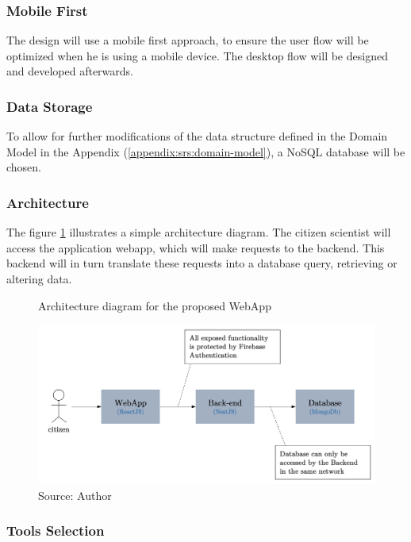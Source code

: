 \subsubsection{Mobile First}

The design will use a mobile first approach, to ensure the user flow will be optimized when he is using a mobile device. The desktop flow will be designed and developed afterwards.

\subsubsection{Data Storage}

To allow for further modifications of the data structure defined in the Domain Model in the Appendix (\ref{appendix:srs:domain-model}), a NoSQL database will be chosen.

\subsubsection{Architecture}

The figure \ref{fig:webapp-architecture} illustrates a simple architecture diagram. The citizen scientist will access the application webapp, which will make requests to the backend. This backend will in turn translate these requests into a database query, retrieving or altering data.

\begin{figure}[h]
    \centering
    \caption{Architecture diagram for the proposed WebApp}
    \label{fig:webapp-architecture}
    \includegraphics[width=\linewidth]{images/sw-req-spec/architecture.png}
    \caption*{Source: Author}
\end{figure}

\subsubsection{Tools Selection}

